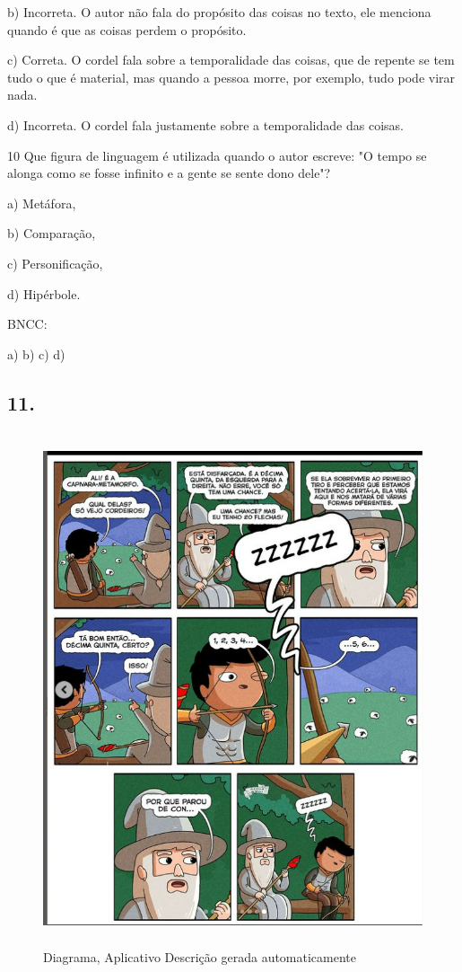 {b) Incorreta. O autor não fala do propósito das coisas no texto, ele
menciona quando é que as coisas perdem o propósito.

c) Correta. O cordel fala sobre a temporalidade das coisas, que de
repente se tem tudo o que é material, mas quando a pessoa morre, por
exemplo, tudo pode virar nada.

d) Incorreta. O cordel fala justamente sobre a temporalidade das coisas.

\num{10} Que figura de linguagem é utilizada quando o autor escreve: "O
tempo se alonga como se fosse infinito e a gente se sente dono dele"?

a) Metáfora,

b) Comparação,

c) Personificação,

d) Hipérbole.

BNCC:

a) b) c) d)

\subsection{11.}

\begin{figure}
\centering
\includegraphics[width=4.77759in,height=5.95in]{./imgSAEB_6_POR/media/image50.png}
\caption{Diagrama, Aplicativo Descrição gerada automaticamente}
\end{figure}

}
